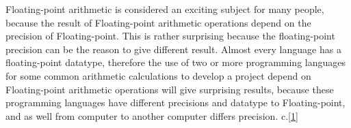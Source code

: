 \documentclass[11pt]{article}
\begin{document}
Floating-point arithmetic is considered an exciting subject for many people, because the result of Floating-point arithmetic operations depend on the precision of Floating-point. This is rather surprising because the floating-point precision can be the reason to give different result. Almost every language has a floating-point datatype, therefore the use of two or more programming languages for some common arithmetic calculations to develop a project depend on Floating-point arithmetic operations will give surprising results, because these programming languages have different precisions and datatype to Floating-point, and as well from computer to another computer differs precision. c.\ref{1}\\

\end{document}
